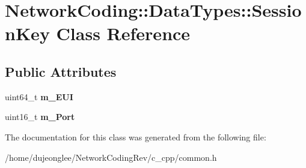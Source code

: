 \hypertarget{class_network_coding_1_1_data_types_1_1_session_key}{}\section{Network\+Coding\+:\+:Data\+Types\+:\+:Session\+Key Class Reference}
\label{class_network_coding_1_1_data_types_1_1_session_key}
\subsection*{Public Attributes}
\begin{DoxyCompactItemize}
\item 
uint64\+\_\+t {\bfseries m\+\_\+\+E\+UI}\hypertarget{class_network_coding_1_1_data_types_1_1_session_key_a302ca92409a4c037326fb1d7c0f71041}{}\label{class_network_coding_1_1_data_types_1_1_session_key_a302ca92409a4c037326fb1d7c0f71041}

\item 
uint16\+\_\+t {\bfseries m\+\_\+\+Port}\hypertarget{class_network_coding_1_1_data_types_1_1_session_key_a954eb8e0e38dc38180a535be0bb17b2a}{}\label{class_network_coding_1_1_data_types_1_1_session_key_a954eb8e0e38dc38180a535be0bb17b2a}

\end{DoxyCompactItemize}


The documentation for this class was generated from the following file\+:\begin{DoxyCompactItemize}
\item 
/home/dujeonglee/\+Network\+Coding\+Rev/c\+\_\+cpp/common.\+h\end{DoxyCompactItemize}
